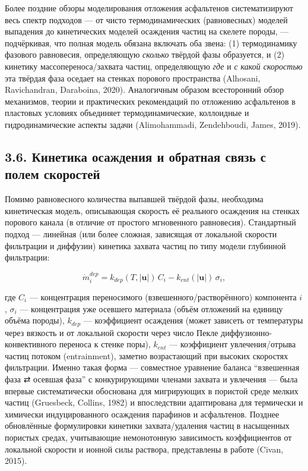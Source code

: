 \documentclass[11pt]{extarticle}
\begin{document}
Более поздние обзоры моделирования отложения асфальтенов систематизируют весь спектр подходов --- от чисто термодинамических (равновесных) моделей выпадения до кинетических моделей осаждения частиц на скелете породы, --- подчёркивая, что полная модель обязана включать оба звена: (1) термодинамику фазового равновесия, определяющую \emph{сколько} твёрдой фазы образуется, и (2) кинетику массопереноса/захвата частиц, определяющую \emph{где} и \emph{с какой скоростью} эта твёрдая фаза оседает на стенках порового пространства (Alhosani, Ravichandran, Daraboina, 2020). Аналогичным образом всесторонний обзор механизмов, теории и практических рекомендаций по отложению асфальтенов в пластовых условиях объединяет термодинамические, коллоидные и гидродинамические аспекты задачи (Alimohammadi, Zendehboudi, James, 2019).

\subsection{3.6. Кинетика осаждения и обратная связь с полем скоростей}\label{ux43aux438ux43dux435ux442ux438ux43aux430-ux43eux441ux430ux436ux434ux435ux43dux438ux44f-ux438-ux43eux431ux440ux430ux442ux43dux430ux44f-ux441ux432ux44fux437ux44c-ux441-ux43fux43eux43bux435ux43c-ux441ux43aux43eux440ux43eux441ux442ux435ux439}

Помимо равновесного количества выпавшей твёрдой фазы, необходима кинетическая модель, описывающая скорость её реального осаждения на стенках порового канала (в отличие от простого мгновенного равновесия). Стандартный подход --- линейная (или более сложная, зависящая от локальной скорости фильтрации и диффузии) кинетика захвата частиц по типу модели глубинной фильтрации:

\[
\dot m_i^{dep} = k_{dep}(T, |\mathbf{u}|)\, C_i - k_{ent}(|\mathbf{u}|)\, \sigma_i ,
\]

где \(C_i\) --- концентрация переносимого (взвешенного/растворённого) компонента \(i\), \(\sigma_i\) --- концентрация уже осевшего материала (объём отложений на единицу объёма породы), \(k_{dep}\) --- коэффициент осаждения (может зависеть от температуры через вязкость и от локальной скорости через число Пекле диффузионно-конвективного переноса к стенке поры), \(k_{ent}\) --- коэффициент увлечения/отрыва частиц потоком (entrainment), заметно возрастающий при высоких скоростях фильтрации. Именно такая форма --- совместное уравнение баланса ``взвешенная фаза ⇄ осевшая фаза'' с конкурирующими членами захвата и увлечения --- была впервые систематически обоснована для мигрирующих в пористой среде мелких частиц (Gruesbeck, Collins, 1982) и впоследствии адаптирована для термически и химически индуцированного осаждения парафинов и асфальтенов. Позднее обновлённые формулировки кинетики захвата/удаления частиц в насыщенных пористых средах, учитывающие немонотонную зависимость коэффициентов от локальной скорости и ионной силы раствора, представлены в работе (Civan, 2015).
\end{document}

